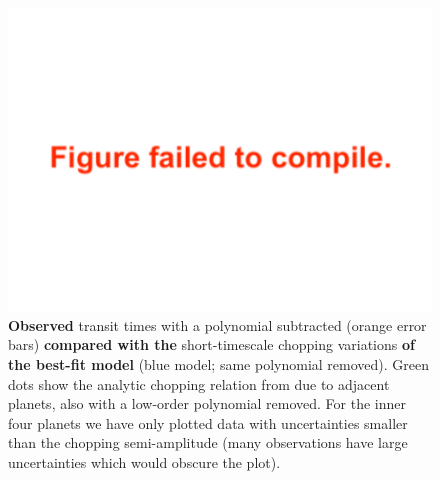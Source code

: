 \documentclass[twocolumn]{aastex63}
\begin{document}
\begin{figure}
    \centering
    \includegraphics[width=\hsize]{figures/T1_chopping.pdf}
    {\textbf{Observed} transit times with a polynomial subtracted (orange error bars) \textbf{compared with the} short-timescale chopping variations \textbf{of the best-fit model} (blue model; same polynomial removed).  Green dots show the analytic chopping relation from \citet{Deck2015} due to adjacent planets, also with a low-order polynomial removed. For the inner four planets we have
        only plotted data with
        uncertainties smaller than the chopping semi-amplitude  (many observations have large uncertainties which would obscure the plot).}
    \label{fig:chopping}
\end{figure}
\end{document}
